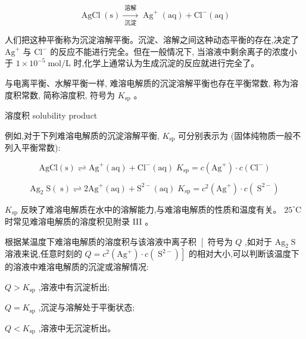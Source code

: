 \documentclass[10pt]{article}
\begin{document}
\[
\operatorname{AgCl}\left( \mathrm{s}\right) \xrightarrow[\text{ 沉淀 }]{\text{ 溶解 }}{\operatorname{Ag}}^{ + }\left( \mathrm{{aq}}\right) + {\mathrm{{Cl}}}^{ - }\left( \mathrm{{aq}}\right)
\]

人们把这种平衡称为沉淀溶解平衡。沉淀、溶解之间这种动态平衡的存在,决定了 \({\mathrm{{Ag}}}^{ + }\) 与 \({\mathrm{{Cl}}}^{ - }\) 的反应不能进行完全。但在一般情况下, 当溶液中剩余离子的浓度小于 \(1 \times {10}^{-5}\mathrm{\;{mol}}/\mathrm{L}\) 时,化学上通常认为生成沉淀的反应就进行完全了。

与电离平衡、水解平衡一样, 难溶电解质的沉淀溶解平衡也存在平衡常数, 称为溶度积常数, 简称溶度积, 符号为 \({K}_{\mathrm{{sp}}}\) 。

\begin{mdframed}

溶度积 solubility product

\end{mdframed}

例如,对于下列难溶电解质的沉淀溶解平衡, \({K}_{\mathrm{{sp}}}\) 可分别表示为 (固体纯物质一般不列入平衡常数):

\[
\mathrm{{AgCl}}\left( \mathrm{s}\right) \rightleftharpoons {\mathrm{{Ag}}}^{ + }\left( \mathrm{{aq}}\right) + {\mathrm{{Cl}}}^{ - }\left( \mathrm{{aq}}\right) \;{K}_{\mathrm{{sp}}} = c\left( {\mathrm{{Ag}}}^{ + }\right) \cdot c\left( {\mathrm{{Cl}}}^{ - }\right)
\]

\[
{\mathrm{{Ag}}}_{2}\mathrm{\;S}\left( \mathrm{\;s}\right) \rightleftharpoons 2{\mathrm{{Ag}}}^{ + }\left( \mathrm{{aq}}\right) + {\mathrm{S}}^{2 - }\left( \mathrm{{aq}}\right) \;{K}_{\mathrm{{sp}}} = {c}^{2}\left( {\mathrm{{Ag}}}^{ + }\right) \cdot c\left( {\mathrm{\;S}}^{2 - }\right)
\]

\({K}_{\mathrm{{sp}}}\) 反映了难溶电解质在水中的溶解能力,与难溶电解质的性质和温度有关。 \({25}^{ \circ }\mathrm{C}\) 时常见难溶电解质的溶度积见附录 III 。

根据某温度下难溶电解质的溶度积与该溶液中离子积 \(\left\lbrack \right.\) 符号为 \(Q\) ,如对于 \({\mathrm{{Ag}}}_{2}\mathrm{\;S}\) 溶液来说,任意时刻的 \(\left. {Q = {c}^{2}\left( {\mathrm{{Ag}}}^{ + }\right) \cdot c\left( {\mathrm{\;S}}^{2 - }\right) }\right\rbrack\) 的相对大小,可以判断该温度下的溶液中难溶电解质的沉淀或溶解情况:

\(Q > {K}_{\mathrm{{sp}}}\) ,溶液中有沉淀析出;

\(Q = {K}_{\mathrm{{sp}}}\) ,沉淀与溶解处于平衡状态;

\(Q < {K}_{\mathrm{{sp}}}\) ,溶液中无沉淀析出。
\end{document}
